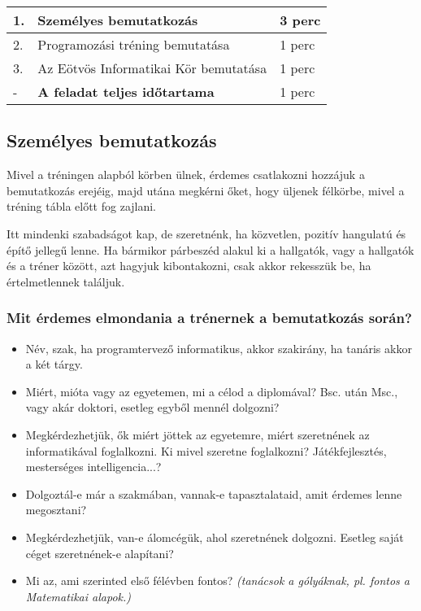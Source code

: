 \documentclass[../Main.tex]{subfiles}
\begin{document}
\begin{center}
    \begin{tabular}{| m{1.3 em} | m{} | m{} |}
    \hline
    1. & Személyes bemutatkozás & 3 perc \\
    \hline
    2. & Programozási tréning bemutatása & 1 perc \\
    \hline
    3. & Az Eötvös Informatikai Kör bemutatása & 1 perc \\
    \hline
    - & \textbf{A feladat teljes időtartama} & 1 perc \\
    \hline
    \end{tabular}
\end{center}

\subsection{Személyes bemutatkozás}
Mivel a tréningen alapból körben ülnek, érdemes csatlakozni hozzájuk a bemutatkozás erejéig,
majd utána megkérni őket, hogy üljenek félkörbe, mivel a tréning tábla előtt fog zajlani.

Itt mindenki szabadságot kap, de szeretnénk, ha közvetlen, pozitív hangulatú és építő jellegű
lenne. Ha bármikor párbeszéd alakul ki a hallgatók, vagy a hallgatók és a tréner között,
azt hagyjuk kibontakozni, csak akkor rekesszük be, ha értelmetlennek találjuk.

\subsubsection{Mit érdemes elmondania a trénernek a bemutatkozás során?}

\begin{itemize}
    \item Név, szak, ha programtervező informatikus, akkor szakirány,
    ha tanáris akkor a két tárgy.
    \item Miért, mióta vagy az egyetemen, mi a célod a diplomával?
    Bsc. után Msc., vagy akár doktori, esetleg egyből mennél dolgozni?
    \item Megkérdezhetjük, ők miért jöttek az egyetemre, miért szeretnének
    az informatikával foglalkozni. Ki mivel szeretne foglalkozni?
    Játékfejlesztés, mesterséges intelligencia...?
    \item Dolgoztál-e már a szakmában, vannak-e tapasztalataid, amit érdemes lenne megosztani?
    \item Megkérdezhetjük, van-e álomcégük, ahol szeretnének dolgozni.
    Esetleg saját céget szeretnének-e alapítani?
    \item Mi az, ami szerinted első félévben fontos? 
    \textit{(tanácsok a gólyáknak, pl. fontos a Matematikai alapok.)}
\end{itemize}
\end{document}
